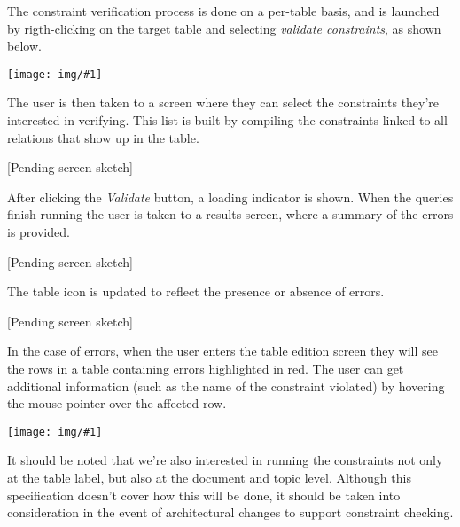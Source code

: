 \documentclass[a4paper, 10pt]{article}
\newcommand{\img}[2]{
  \begin{center}
    \texttt{[image: img/\#1]}
  \end{center}
}
\begin{document}
The constraint verification process is done on a per-table basis, and is
launched by rigth-clicking on the target table and selecting \textit{validate
constraints}, as shown below.

\img{validate-constraints-menu-item.png}{5cm}

The user is then taken to a screen where they can select the constraints
they're interested in verifying. This list is built by compiling the
constraints linked to all relations that show up in the table.

\vspace{0.2cm}
[Pending screen sketch]
\vspace{0.2cm}

After clicking the \textit{Validate} button, a loading indicator is shown. When
the queries finish running the user is taken to a results screen, where a
summary of the errors is provided.

\vspace{0.2cm}
[Pending screen sketch]
\vspace{0.2cm}

The table icon is updated to reflect the presence or absence of errors.

\vspace{0.2cm}
[Pending screen sketch]
\vspace{0.2cm}

In the case of errors, when the user enters the table edition screen they will
see the rows in a table containing errors highlighted in red. The user can get
additional information (such as the name of the constraint violated) by
hovering the mouse pointer over the affected row.

\img{validate-constraints-results.png}{12cm}

It should be noted that we're also interested in running the constraints not
only at the table label, but also at the document and topic level. Although
this specification doesn't cover how this will be done, it should be taken into
consideration in the event of architectural changes to support constraint
checking.


%
\end{document}
